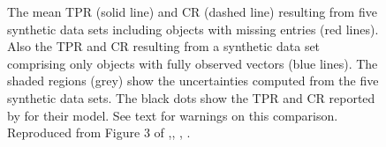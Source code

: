 \begin{figure}[ht!]
\begin{center}
\caption{The mean TPR (solid line) and CR (dashed line) resulting from five synthetic data sets including objects with missing entries (red lines). Also the TPR and CR resulting from a synthetic data set comprising only objects with fully observed vectors (blue lines). The shaded regions (grey) show the uncertainties computed from the five synthetic data sets. The black dots show the TPR and CR reported by \citet{Sarro2014} for their model. See text for warnings on this comparison. Reproduced from Figure 3 of \citet{Olivares2017},\textit{}, , .}
\label{fig:TPR-CR}
\end{center}
\end{figure}

